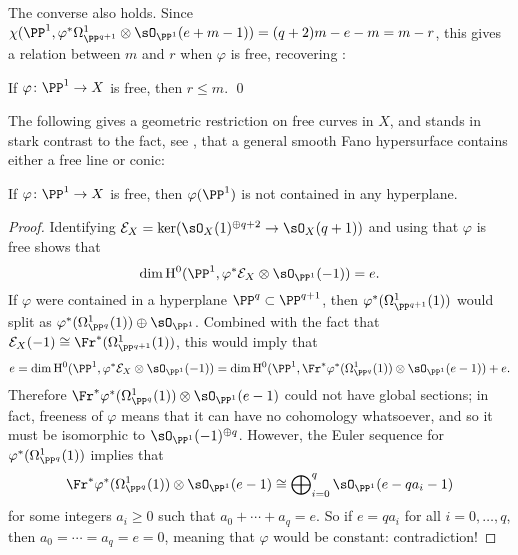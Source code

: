 The converse also holds. Since
\(\chi(\PP^1, \varphi^*\Omega^1_{\PP^{q+1}} \otimes \sO_{\PP^1}(e+m-1)) = (q+2)m - e - m = m - r\),
this gives a relation between \(m\) and \(r\) when \(\varphi\) is free,
recovering \cite[Theorem 1.7]{Shen}:

\begin{Lemma}\label{r-at-most-m}
If \(\varphi \colon \PP^1 \to X\) is free, then \(r \leq m\). \qed
\end{Lemma}

The following gives a geometric restriction on free curves in \(X\), and stands
in stark contrast to the fact, see \cite[V.4.4]{Kollar}, that a general
smooth Fano hypersurface contains either a free line or conic:


\begin{Lemma}\label{free-nondegen}
If \(\varphi \colon \PP^1 \to X\) is free, then \(\varphi(\PP^1)\) is not
contained in any hyperplane.
\end{Lemma}

\begin{proof}
Identifying \(\mathcal{E}_X = \ker(\sO_X(1)^{\oplus q+2} \to \sO_X(q+1))\) and
using that \(\varphi\) is free shows that
\[
\dim\mathrm{H}^0(\PP^1, \varphi^*\mathcal{E}_X \otimes \sO_{\PP^1}(-1)) = e.
\]
If \(\varphi\) were contained in a hyperplane \(\PP^q \subset \PP^{q+1}\), then
\(\varphi^*(\Omega^1_{\PP^{q+1}}(1))\) would split as
\(\varphi^*(\Omega^1_{\PP^q}(1)) \oplus \sO_{\PP^1}\). Combined with the fact
that \(\mathcal{E}_X(-1) \cong \Fr^*(\Omega^1_{\PP^{q+1}}(1))\), this would
imply that
\[
e =  \dim\mathrm{H}^0(\PP^1, \varphi^*\mathcal{E}_X \otimes \sO_{\PP^1}(-1)) =
\dim\mathrm{H}^0(\PP^1, \Fr^*\varphi^*(\Omega^1_{\PP^q}(1)) \otimes \sO_{\PP^1}(e-1)) + e.
\]
Therefore \(\Fr^*\varphi^*(\Omega^1_{\PP^q}(1)) \otimes \sO_{\PP^1}(e-1)\)
could not have global sections; in fact, freeness of \(\varphi\) means that it
can have no cohomology whatsoever, and so it must be isomorphic to
\(\sO_{\PP^1}(-1)^{\oplus q}\). However, the Euler sequence for
\(\varphi^*(\Omega^1_{\PP^q}(1))\) implies that
\[
\Fr^*\varphi^*(\Omega^1_{\PP^q}(1)) \otimes \sO_{\PP^1}(e-1) \cong
\bigoplus\nolimits_{i = 0}^q \sO_{\PP^1}(e-qa_i-1)
\]
for some integers \(a_i \geq 0\) such that \(a_0 + \cdots + a_q = e\). So
if \(e = qa_i\) for all \(i = 0,\ldots, q\), then \(a_0 = \cdots = a_q = e = 0\),
meaning that \(\varphi\) would be constant: contradiction!
\end{proof}

